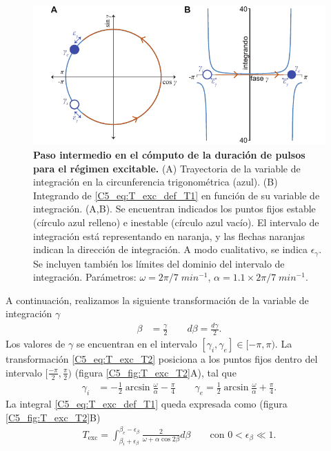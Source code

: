 { \begin{figure}
    \centering
    \includegraphics[width=1\columnwidth]{figures/chapter5/C5_T_exc_T1.pdf} 
    \caption{\textbf{Paso intermedio en el cómputo de la duración de pulsos para el régimen excitable.} (A) Trayectoria de la variable de integración en la circunferencia trigonométrica (azul). (B) Integrando de \ref{C5_eq:T_exc_def_T1} en función de su variable de integración. (A,B). Se encuentran indicados los puntos fijos estable \xxe (círculo azul relleno) e inestable \xxi (círculo azul vacío). El intervalo de integración está representando en naranja, y  las flechas naranjas indican la dirección de integración. A modo cualitativo, se indica $\epsilon_\gamma$. Se incluyen también los límites del dominio del intervalo de integración. Parámetros: $\omega=2\pi/7\;min^{-1}$, $\alpha = 1.1 \times 2\pi/7\;min^{-1}$.}
    \label{C5_fig:T_exc_T1}
\end{figure}

A continuación, realizamos la siguiente transformación de la variable de integración $\gamma$
\begin{align}
    \beta &= \frac{\gamma}{2} \qquad
    d\beta = \frac{d\gamma}{2}.
    \label{C5_eq:T_exc_T2}
\end{align}
Los valores de $\gamma$ se encuentran en el intervalo $[\gamma_i,\gamma_e] \in [-\pi, \pi)$. La transformación \ref{C5_eq:T_exc_T2} posiciona a los puntos fijos dentro del intervalo $[\frac{-\pi}{2},\frac{\pi}{2})$ (figura \ref{C5_fig:T_exc_T2}A), tal que
\begin{align}
    \gamma_i &= - \frac{1}{2} \arcsin{\frac{\omega}{\alpha}} - \frac{\pi}{4} \qquad
    \gamma_e  = \frac{1}{2} \arcsin{\frac{\omega}{\alpha}} + \frac{\pi}{4}.
\end{align}
La integral \ref{C5_eq:T_exc_def_T1} queda expresada como (figura \ref{C5_fig:T_exc_T2}B)
\begin{align}
    T_{\text{exc}} = \int_{\beta_i+\epsilon_\beta}^{\beta_e-\epsilon_\beta}  \frac{2}{\omega + \alpha \cos{2 \beta}} d\beta \qquad \text{con } 0< \epsilon_\beta \ll 1.
    \label{C5_eq:T_exc_def_T2}
\end{align}

}
